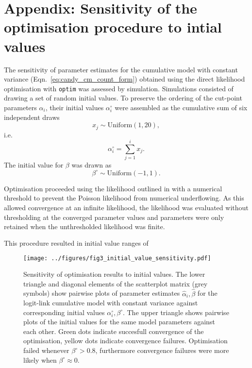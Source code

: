 \section{Appendix: Sensitivity of the optimisation procedure to intial values}
The sensitivity of parameter estimates for the cumulative model with constant variance (Eqn.~\ref{eq:candy_cm_count_form}) obtained using the direct likelihood optimisation with \verb+optim+ was assessed by simulation.
Simulations consisted of drawing a set of random initial values. To preserve the ordering of the cut-point parameters $\alpha_i$, their initial values $\alpha^{\circ}_i$ were assembled as the cumulative sum of six independent draws $$x_j \sim \mathrm{Uniform}(1,20),$$ i.e. $$\alpha^{\circ}_i = \sum_{j=1}^i x_j.$$ The initial value for $\beta$ was drawn as $$\beta^{\circ}\sim\mathrm{Uniform}(-1,1).$$

Optimisation proceeded using the likelihood outlined in with a numerical threshold to prevent the Poisson likelihood from numerical underflowing. As this allowed convergence at an infinite likelihood, the likelihood was evaluated without thresholding at the converged parameter values and parameters were only retained when the unthresholded likelihood was finite.

This procedure resulted in initial value ranges of 
\begin{figure}[p]
  \centering
  \texttt{[image: ../figures/fig3\_initial\_value\_sensitivity.pdf]}
  \caption{Sensitivity of optimisation results to initial values. The lower triangle and diagonal elements of the scatterplot matrix (grey symbols) show pairwise plots of parameter estimates $\hat{\alpha}_i, \hat{\beta}$ for the logit-link cumulative model with constant variance against corresponding initial values $\alpha^{\circ}_i, \beta^{\circ}$. The upper triangle shows pairwise plots of the initial values for the same model parameters against each other. Green dots indicate succesfull convergence of the optimisation, yellow dots indicate convergence failures. Optimisation failed whenever $\beta^{\circ}>0.8$, furthermore convergence failures were more likely when $\beta^{\circ}\approx 0$.}
  \label{fig:fig3}
\end{figure} 